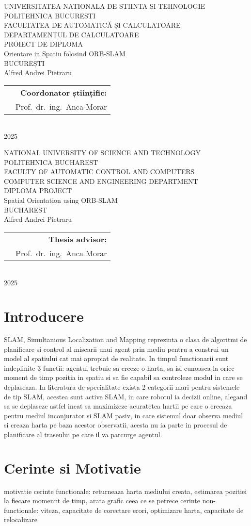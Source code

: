 \documentclass[12pt,a4paper]{report}
\makeatletter
\newcommand{\HeaderLineSpace}{-0.25cm}
\newcommand{\UniTextRO}{UNIVERSITATEA NATIONALA DE STIINTA SI TEHNOLOGIE POLITEHNICA BUCURESTI \\[\HeaderLineSpace] 
FACULTATEA DE AUTOMATICĂ ȘI CALCULATOARE \\[\HeaderLineSpace]
DEPARTAMENTUL DE CALCULATOARE\\}
\newcommand{\DiplomaRO}{PROIECT DE DIPLOMA}
\newcommand{\AdvisorRO}{Coordonator științific:}
\newcommand{\BucRO}{BUCUREȘTI}
\newcommand{\UniTextEN}{NATIONAL UNIVERSITY OF SCIENCE AND TECHNOLOGY POLITEHNICA BUCHAREST \\[\HeaderLineSpace]
FACULTY OF AUTOMATIC CONTROL AND COMPUTERS \\[\HeaderLineSpace]
COMPUTER SCIENCE AND ENGINEERING DEPARTMENT\\}
\newcommand{\DiplomaEN}{DIPLOMA PROJECT}
\newcommand{\AdvisorEN}{Thesis advisor:}
\newcommand{\BucEN}{BUCHAREST}
\newcommand{\ProjectTitleRO}{Orientare in Spatiu folosind ORB-SLAM}
\newcommand{\ProjectTitleEN}{Spatial Orientation using ORB-SLAM}
\newcommand{\frontPage}[6]{
\begin{titlepage}
\begin{center}
{\Large #1}  %
\vspace{50pt}
\vspace{105pt}
{\Huge #2}\\  %
\vspace{40pt}
{\Large #3}\\ \vspace{0pt}  %
{\Large #4}\\     %
\vspace{40pt}
{\LARGE Alfred Andrei Pietraru}\\   %
\end{center}
\vspace{60pt}
\begin{tabular*}{\textwidth}{@{\extracolsep{\fill}}p{6cm}r}
&{\large\textbf{#5}}\vspace{10pt}\\      %
&{\large Prof.\ dr.\ ing.\ Anca Morar}   %
\end{tabular*}
\vspace{20pt}
\begin{center}
{\large\textbf{#6}}\\    %
\vspace{0pt}
{\normalsize 2025}
\end{center}
\end{titlepage}
}
\newcommand{\frontPageRO}{\frontPage{\UniTextRO}{\DiplomaRO}{\ProjectTitleRO}{\BucRO}{\AdvisorRO}}
\newcommand{\frontPageEN}{\frontPage{\UniTextEN}{\DiplomaEN}{\ProjectTitleEN}{\BucEN}{\AdvisorEN}}
\makeatother
\begin{document}
\frontPageRO{}
\frontPageEN{}
\AbstractPage{}
\chapter{Introducere}
SLAM, Simultanious Localization and Mapping reprezinta o clasa de algoritmi de planificare si control 
al miscarii unui agent prin mediu pentru a construi un model al spatiului cat mai apropiat de realitate.
In timpul functionarii sunt indeplinite 3 functii: agentul trebuie sa creeze o harta, sa isi 
cunoasca la orice moment de timp pozitia in spatiu si sa fie capabil sa controleze modul in care se 
deplaseaza. In literatura de specialitate exista 2 categorii mari pentru sistemele de tip SLAM, acestea 
sunt active SLAM, in care robotul ia decizii online, alegand sa se deplaseze astfel incat sa maximizeze 
acuratetea hartii pe care o creeaza pentru mediul inconjurator si SLAM pasiv, in care sistemul doar 
observa mediul si creaza harta pe baza acestor observatii, acesta nu ia parte in procesul de planificare
al traseului pe care il va parcurge agentul.

\chapter{Cerinte si Motivatie}
motivatie 
cerinte functionale: returneaza harta mediului creata, estimarea pozitiei la fiecare 
momennt de timp, arata grafic ceea ce se petrece   
cerinte non-functionale: viteza, capacitate de corectare erori, optimizare harta, capacitate
de relocalizare  
\end{document}

